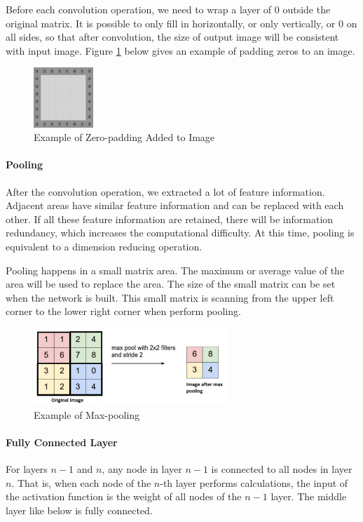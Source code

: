 Before each convolution operation, we need to wrap a layer of 0 outside the original matrix. It is possible to only fill in horizontally, or only vertically, or 0 on all sides, so that after convolution, the size of output image will be consistent with input image. Figure \ref{fig:padding} below gives an example of padding zeros to an image.

\begin{figure}[h!]
\centering
\includegraphics[width=0.2\textwidth]{zeropadding.pdf}
\caption{Example of Zero-padding Added to Image \cite{pooling}}
\label{fig:padding}
\end{figure}

\paragraph{Pooling}
After the convolution operation, we extracted a lot of feature information. Adjacent areas have similar feature information and can be replaced with each other. If all these feature information are retained, there will be information redundancy, which increases the computational difficulty. At this time, pooling is equivalent to a dimension reducing operation. 

Pooling happens in a small matrix area. The maximum or average value of the area will be used to replace the area. The size of the small matrix can be set when the network is built. This small matrix is scanning from the upper left corner to the lower right corner when perform pooling.

\begin{figure}[h!]
\centering
\includegraphics[width=0.65\textwidth]{pooling.pdf}
\caption{Example of Max-pooling \cite{pooling}}
\label{fig:pooling}
\end{figure}

\paragraph{Fully Connected Layer}
For layers $n-1$ and $n$, any node in layer $n-1$ is connected to all nodes in layer $n$. That is, when each node of the $n$-th layer performs calculations, the input of the activation function is the weight of all nodes of the $n-1$ layer. The middle layer like below is fully connected.

